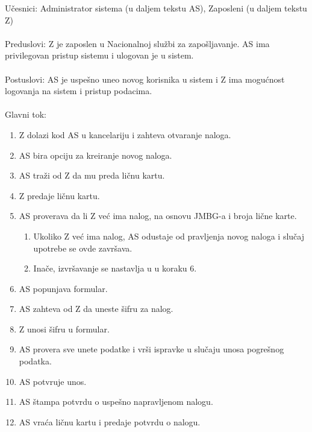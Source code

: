 \noindent U\v cesnici: Administrator sistema (u daljem tekstu AS), Zaposleni (u daljem tekstu Z)
\\
\\ Preduslovi: Z je zaposlen u Nacionalnoj slu\v zbi za zapo\v sljavanje. AS ima privilegovan pristup sistemu i ulogovan je u sistem.
\\
\\ Postuslovi: AS je uspe\v sno uneo novog korisnika u sistem i Z ima mogu\' cnost logovanja na sistem i pristup podacima.
\\
\\ Glavni tok:
\begin{enumerate}
	\item Z dolazi kod AS u kancelariju i zahteva otvaranje naloga.
	\item AS bira opciju za kreiranje novog naloga.
	\item AS tra\v zi od Z da mu preda li\v cnu kartu.
	\item Z predaje li\v cnu kartu.
	\item AS proverava da li Z ve\' c ima nalog, na osnovu JMBG-a i broja li\v cne karte.
	\begin{enumerate}
		\item Ukoliko Z ve\' c ima nalog, AS odustaje od pravljenja novog naloga i slu\v caj upotrebe se ovde zavr\v sava.
		\item Ina\v ce, izvr\v savanje se nastavlja u u koraku 6.
	\end{enumerate}
	\item AS popunjava formular.
	\item AS zahteva od Z da uneste \v sifru za nalog.
	\item Z unosi \v sifru u formular.
	\item AS provera sve unete podatke i vr\v si ispravke u slu\v caju unosa pogre\v snog podatka.
	\item AS potvr\dj uje unos.
	\item AS \v stampa potvrdu o uspe\v sno napravljenom nalogu.
	\item AS vra\' ca li\v cnu kartu i predaje potvrdu o nalogu. 
	
\end{enumerate}

